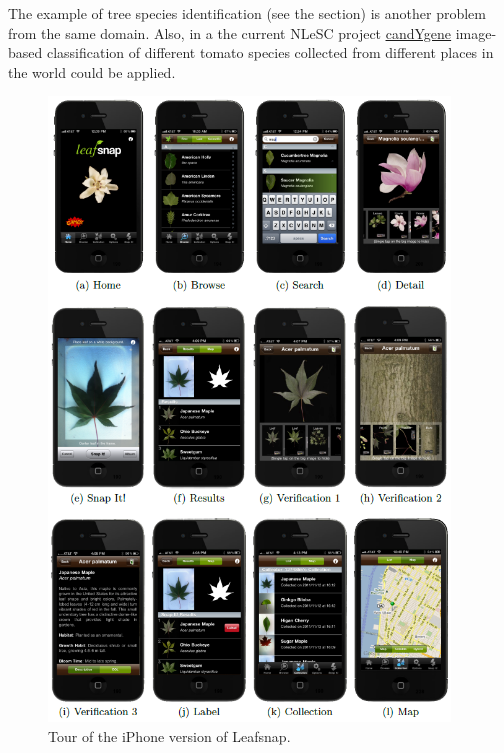 The example of tree species identification (see the \underline{} section) is another problem from the same domain. Also, in a the current NLeSC project \href{https://www.esciencecenter.nl/project/prediction-of-candidate-genes-for-traits-using-interoperable-genome-annotat}{\underline{candYgene}} image-based classification of different tomato species collected from different places in the world could be applied. 
\begin{figure}[H]
\begin{center}
\includegraphics[width=0.95\textwidth]{fig/LeafSnap}
\end{center}
\caption{Tour of the iPhone version of Leafsnap.}
\label{fig:Leafsnap}
\end{figure}



